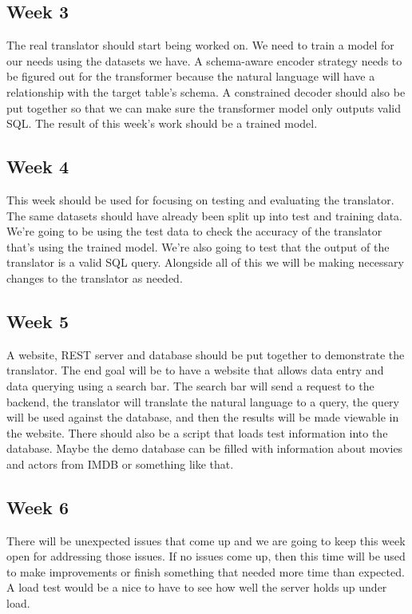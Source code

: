 \documentclass{article}
\begin{document}
\subsection*{Week 3}

The real translator should start being worked on. We need to train a model for our needs using the datasets we have.
A schema-aware encoder strategy needs to be figured out for the transformer because the natural language will have a relationship with the target table's schema.
A constrained decoder should also be put together so that we can make sure the transformer model only outputs valid SQL.
The result of this week's work should be a trained model.

\subsection*{Week 4}

This week should be used for focusing on testing and evaluating the translator. The same datasets should have already been split up into
test and training data. We're going to be using the test data to check the accuracy of the translator that's using the trained model.
We're also going to test that the output of the translator is a valid SQL query.
Alongside all of this we will be making necessary changes to the translator as needed.

\subsection*{Week 5}

A website, REST server and database should be put together to demonstrate the translator. The end goal will be to have a website
that allows data entry and data querying using a search bar. The search bar will send a request to the backend, the translator will translate
the natural language to a query, the query will be used against the database, and then the results will be made viewable in the website.
There should also be a script that loads test information into the database. Maybe the demo database can be filled with information about
movies and actors from IMDB or something like that.

\subsection*{Week 6}

There will be unexpected issues that come up and we are going to keep this week open for addressing those issues. If no issues come up, then
this time will be used to make improvements or finish something that needed more time than expected.
A load test would be a nice to have to see how well the server holds up under load.
\end{document}
